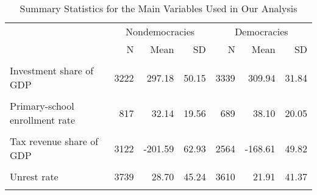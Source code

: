 \begin{table}[H]
\centering
\caption{\label{tab:unnamed-chunk-9}Summary Statistics for the Main Variables Used in Our Analysis}
\centering
\begin{tabular}[t]{lrrrrrr}
\toprule
\multicolumn{1}{c}{ } & \multicolumn{3}{c}{Nondemocracies} & \multicolumn{3}{c}{Democracies} \\
\cmidrule(l{3pt}r{3pt}){2-4} \cmidrule(l{3pt}r{3pt}){5-7}
 & N & Mean & SD & N & Mean & SD\\
\midrule
\cellcolor{gray!10}{GDP per capita} & \cellcolor{gray!10}{3376} & \cellcolor{gray!10}{2074.46} & \cellcolor{gray!10}{3838.65} & \cellcolor{gray!10}{3558} & \cellcolor{gray!10}{8149.97} & \cellcolor{gray!10}{9334.83}\\
Investment share of GDP & 3222 & 297.18 & 50.15 & 3339 & 309.94 & 31.84\\
\cellcolor{gray!10}{Trade share of GDP} & \cellcolor{gray!10}{3175} & \cellcolor{gray!10}{406.06} & \cellcolor{gray!10}{67.95} & \cellcolor{gray!10}{3485} & \cellcolor{gray!10}{419.29} & \cellcolor{gray!10}{58.74}\\
Primary-school enrollment rate & 817 & 32.14 & 19.56 & 689 & 38.10 & 20.05\\
\cellcolor{gray!10}{Secondary-school enrollment rate} & \cellcolor{gray!10}{817} & \cellcolor{gray!10}{19.53} & \cellcolor{gray!10}{17.15} & \cellcolor{gray!10}{689} & \cellcolor{gray!10}{34.37} & \cellcolor{gray!10}{19.72}\\
\addlinespace
Tax revenue share of GDP & 3122 & -201.59 & 62.93 & 2564 & -168.61 & 49.82\\
\cellcolor{gray!10}{Child mortality per 1,000 births} & \cellcolor{gray!10}{4142} & \cellcolor{gray!10}{77.29} & \cellcolor{gray!10}{49.64} & \cellcolor{gray!10}{3615} & \cellcolor{gray!10}{33.26} & \cellcolor{gray!10}{32.65}\\
Unrest rate & 3739 & 28.70 & 45.24 & 3610 & 21.91 & 41.37\\
\cellcolor{gray!10}{Market reforms index (0–100)} & \cellcolor{gray!10}{3476} & \cellcolor{gray!10}{21.89} & \cellcolor{gray!10}{23.26} & \cellcolor{gray!10}{2829} & \cellcolor{gray!10}{52.11} & \cellcolor{gray!10}{24.75}\\
\bottomrule
\end{tabular}
\end{table}
